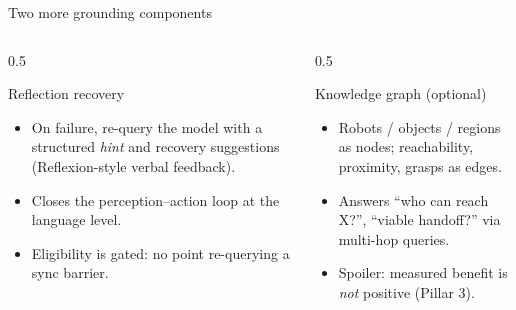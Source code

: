 \documentclass[aspectratio=169,11pt]{beamer}
\begin{document}
\begin{frame}{Two more grounding components}
	\begin{columns}[t]
		\begin{column}{0.5\textwidth}
			\begin{block}{Reflection recovery}
				\begin{itemize}\small
					\item On failure, re-query the model with a structured \emph{hint} and recovery
					      suggestions (Reflexion-style verbal feedback).
					\item Closes the perception--action loop at the language level.
					\item Eligibility is gated: no point re-querying a sync barrier.
				\end{itemize}
			\end{block}
		\end{column}
		\begin{column}{0.5\textwidth}
			\begin{block}{Knowledge graph (optional)}
				\begin{itemize}\small
					\item Robots / objects / regions as nodes; reachability, proximity, grasps as edges.
					\item Answers ``who can reach X?'', ``viable handoff?'' via multi-hop queries.
					\item \alert{Spoiler:} measured benefit is \emph{not} positive (Pillar 3).
				\end{itemize}
			\end{block}
		\end{column}
	\end{columns}
\end{frame}
\end{document}
